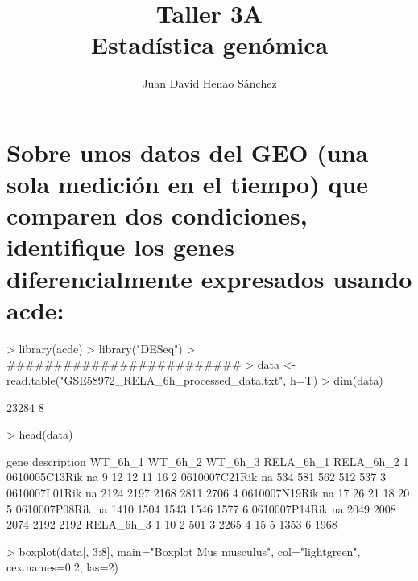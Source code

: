 \documentclass{article}
\title{Taller 3A\\ Estadística genómica}
\author{Juan David Henao Sánchez}
\begin{document}


\maketitle

\section*{Sobre unos datos del GEO (una sola medición en el tiempo) que comparen dos condiciones, identifique los genes diferencialmente expresados usando acde:
}

\begin{Schunk}
\begin{Sinput}
> library(acde)
> library("DESeq")
> #########################
> data <- read.table("GSE58972_RELA_6h_processed_data.txt", h=T)
> dim(data)
\end{Sinput}
\begin{Soutput}
[1] 23284     8
\end{Soutput}
\begin{Sinput}
> head(data)
\end{Sinput}
\begin{Soutput}
           gene description WT_6h_1 WT_6h_2 WT_6h_3 RELA_6h_1 RELA_6h_2
1 0610005C13Rik          na       9      12      12        11        16
2 0610007C21Rik          na     534     581     562       512       537
3 0610007L01Rik          na    2124    2197    2168      2811      2706
4 0610007N19Rik          na      17      26      21        18        20
5 0610007P08Rik          na    1410    1504    1543      1546      1577
6 0610007P14Rik          na    2049    2008    2074      2192      2192
  RELA_6h_3
1        10
2       501
3      2265
4        15
5      1353
6      1968
\end{Soutput}
\end{Schunk}
\begin{Schunk}
\begin{Sinput}
> boxplot(data[, 3:8], main="Boxplot Mus musculus", col="lightgreen", cex.names=0.2, las=2)
\end{Sinput}
\end{Schunk}
\end{document}
